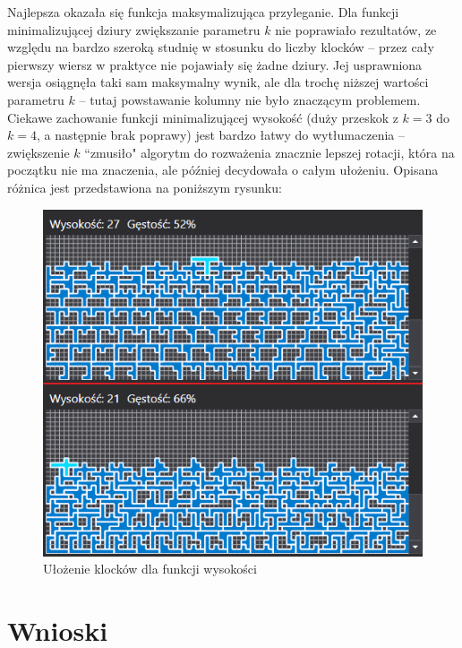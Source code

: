 \documentclass{article}
\begin{document}
Najlepsza okazała się funkcja maksymalizująca przyleganie. Dla funkcji minimalizującej dziury zwiększanie parametru $k$ nie poprawiało rezultatów, ze względu na bardzo szeroką studnię w stosunku do liczby klocków -- przez cały pierwszy wiersz w praktyce nie pojawiały się żadne dziury. Jej usprawniona wersja osiągnęła taki sam maksymalny wynik, ale dla trochę niższej wartości parametru $k$ -- tutaj powstawanie kolumny nie było znaczącym problemem.
Ciekawe zachowanie funkcji minimalizującej wysokość (duży przeskok z $k=3$ do $k=4$, a następnie brak poprawy) jest bardzo łatwy do wytłumaczenia -- zwiększenie $k$ ``zmusiło" algorytm do rozważenia znacznie lepszej rotacji, która na początku nie ma znaczenia, ale później decydowała o całym ułożeniu. Opisana różnica jest przedstawiona na poniższym rysunku: 
\begin{figure}[H]
\includegraphics[width=\textwidth]{wysokosc_bekas.PNG}
\caption{Ułożenie klocków dla funkcji wysokości}
\end{figure}




\section{Wnioski} %
\end{document}
